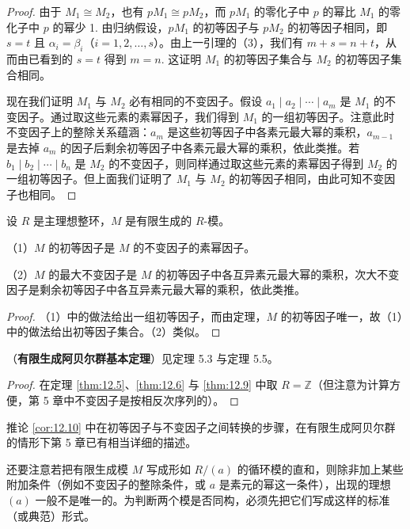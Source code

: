 \begin{proof}
由于 \(M_1 \cong M_2\)，也有 \(pM_1 \cong pM_2\)，而 \(pM_1\) 的零化子中 \(p\) 的幂比 \(M_1\) 的零化子中 \(p\) 的幂少 1. 由归纳假设，\(pM_1\) 的初等因子与 \(pM_2\) 的初等因子相同，即 \(s = t\) 且 \(\alpha_i = \beta_i\)（\(i = 1, 2, \ldots, s\)）。由上一引理的（3），我们有 \(m+s = n+t\)，从而由已看到的 \(s = t\) 得到 \(m = n\). 这证明 \(M_1\) 的初等因子集合与 \(M_2\) 的初等因子集合相同。

现在我们证明 \(M_1\) 与 \(M_2\) 必有相同的不变因子。假设 \(a_1 \mid a_2 \mid \cdots \mid a_m\) 是 \(M_1\) 的不变因子。通过取这些元素的素幂因子，我们得到 \(M_1\) 的一组初等因子。注意此时不变因子上的整除关系蕴涵：\(a_m\) 是这些初等因子中各素元最大幂的乘积，\(a_{m-1}\) 是去掉 \(a_m\) 的因子后剩余初等因子中各素元最大幂的乘积，依此类推。若 \(b_1 \mid b_2 \mid \cdots \mid b_n\) 是 \(M_2\) 的不变因子，则同样通过取这些元素的素幂因子得到 \(M_2\) 的一组初等因子。但上面我们证明了 \(M_1\) 与 \(M_2\) 的初等因子相同，由此可知不变因子也相同。
\end{proof}

\begin{corollary}\label{cor:12.10}
设 \(R\) 是主理想整环，\(M\) 是有限生成的 \(R\)-模。

（1）\(M\) 的初等因子是 \(M\) 的不变因子的素幂因子。

（2）\(M\) 的最大不变因子是 \(M\) 的初等因子中各互异素元最大幂的乘积，次大不变因子是剩余初等因子中各互异素元最大幂的乘积，依此类推。
\end{corollary}

\begin{proof}
（1）中的做法给出一组初等因子，而由定理，\(M\) 的初等因子唯一，故（1）中的做法给出初等因子集合。（2）类似。
\end{proof}

\begin{corollary}\label{cor:12.11}
（\textbf{有限生成阿贝尔群基本定理}）见定理 5.3 与定理 5.5。
\end{corollary}

\begin{proof}
在定理 \ref{thm:12.5}、\ref{thm:12.6} 与 \ref{thm:12.9} 中取 \(R = \mathbb{Z}\)（但注意为计算方便，第 5 章中不变因子是按相反次序列的）。
\end{proof}

推论 \ref{cor:12.10} 中在初等因子与不变因子之间转换的步骤，在有限生成阿贝尔群的情形下第 5 章已有相当详细的描述。

还要注意若把有限生成模 \(M\) 写成形如 \(R/(a)\) 的循环模的直和，则除非加上某些附加条件（例如不变因子的整除条件，或 \(a\) 是素元的幂这一条件），出现的理想 \((a)\) 一般不是唯一的。为判断两个模是否同构，必须先把它们写成这样的标准（或典范）形式。

